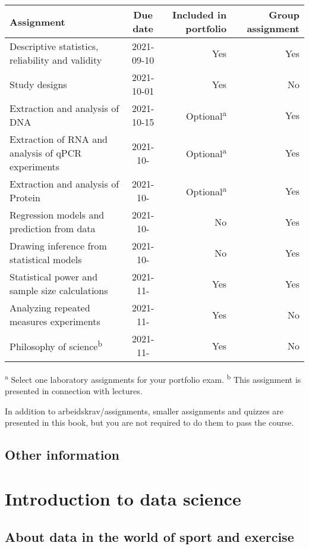 \documentclass[
  11pt,
]{krantz}
\begin{document}
\begin{longtable}[]{@{}lcrr@{}}
\toprule
Assignment & Due date & Included in portfolio & Group assignment \\
\midrule
\endhead
Descriptive statistics, reliability and validity & 2021-09-10 & Yes & Yes \\
Study designs & 2021-10-01 & Yes & No \\
Extraction and analysis of DNA & 2021-10-15 & Optional\textsuperscript{a} & Yes \\
Extraction of RNA and analysis of qPCR experiments & 2021-10- & Optional\textsuperscript{a} & Yes \\
Extraction and analysis of Protein & 2021-10- & Optional\textsuperscript{a} & Yes \\
Regression models and prediction from data & 2021-10- & No & Yes \\
Drawing inference from statistical models & 2021-10- & No & Yes \\
Statistical power and sample size calculations & 2021-11- & Yes & Yes \\
Analyzing repeated measures experiments & 2021-11- & Yes & No \\
Philosophy of science\textsuperscript{b} & 2021-11- & Yes & No \\
\bottomrule
\end{longtable}

\textsuperscript{a} Select one laboratory assignments for your portfolio exam. \textsuperscript{b} This assignment is presented in connection with lectures.

In addition to arbeidskrav/assignments, smaller assignments and quizzes are presented in this book, but you are not required to do them to pass the course.

\hypertarget{other-information}{%
\section{Other information}\label{other-information}}

\hypertarget{introduction-to-data-science}{%
\chapter{Introduction to data science}\label{introduction-to-data-science}}

\hypertarget{about-data-in-the-world-of-sport-and-exercise}{%
\section{About data in the world of sport and exercise}\label{about-data-in-the-world-of-sport-and-exercise}}
\end{document}
